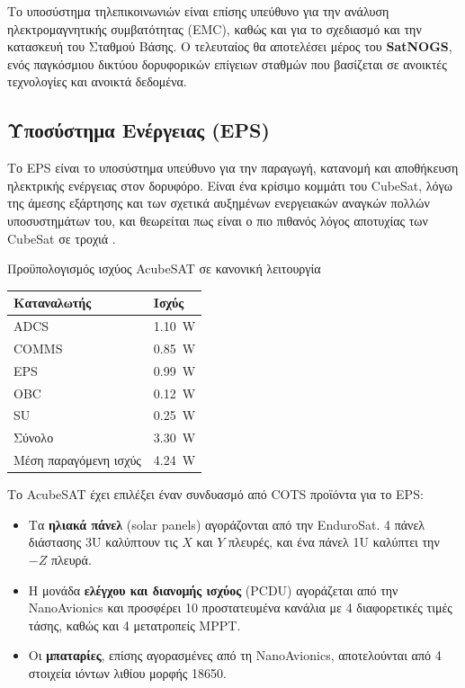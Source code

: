 \documentclass[a4paper,nobib]{tufte-book}
\begin{document}
Το υποσύστημα τηλεπικοινωνιών είναι επίσης υπεύθυνο για την ανάλυση ηλεκτρομαγνητικής συμβατότητας (\acs{EMC}), καθώς και για το σχεδιασμό και την κατασκευή του Σταθμού Βάσης. Ο τελευταίος θα αποτελέσει μέρος του \textbf{SatNOGS}\autocite{white_overview_satellite_2018}, ενός παγκόσμιου δικτύου δορυφορικών επίγειων σταθμών που βασίζεται σε ανοικτές τεχνολογίες και ανοικτά δεδομένα.

\subsection{Υποσύστημα Ενέργειας (\acs{EPS})}

Το \ac{EPS} είναι το υποσύστημα υπεύθυνο για την παραγωγή, κατανομή και αποθήκευση ηλεκτρικής ενέργειας στον δορυφόρο. Είναι ένα κρίσιμο κομμάτι του CubeSat, λόγω της άμεσης εξάρτησης και των σχετικά αυξημένων ενεργειακών αναγκών πολλών υποσυστημάτων του, και θεωρείται πως είναι ο πιο πιθανός λόγος αποτυχίας των CubeSat σε τροχιά \autocite{langer_reliability_cubesats_2016}.

\begin{margintable}
	\caption{Προϋπολογισμός ισχύος AcubeSAT σε κανονική λειτουργία}
	\label{tab:power_budget}
	\begin{tabularx}{\linewidth}{@{}lX@{}}
		\toprule
		\textbf{Καταναλωτής}            & \textbf{Ισχύς}            \\ \midrule
		\acs{ADCS}          & \SI{1.10}{\watt} \\
		\acs{COMMS}         & \SI{0.85}{\watt} \\
		\acs{EPS}           & \SI{0.99}{\watt} \\
		\acs{OBC}           & \SI{0.12}{\watt} \\
		\acs{SU}            & \SI{0.25}{\watt} \\ \midrule
		Σύνολο               & \SI{3.30}{\watt} \\
		Μέση παραγόμενη ισχύς & \SI{4.24}{\watt} \\ \bottomrule
	\end{tabularx}
\end{margintable}

Το AcubeSAT έχει επιλέξει έναν συνδυασμό από \ac{COTS} προϊόντα για το \ac{EPS}: \autocite{DDJF_SYS}
\begin{itemize}
	\item Τα \textbf{ηλιακά πάνελ} (solar panels) αγοράζονται από την EnduroSat. 4 πάνελ διάστασης 3U καλύπτουν τις \(X\) και \(Y\) πλευρές, και ένα πάνελ 1U καλύπτει την \(-Z\) πλευρά.
	\item Η μονάδα \textbf{ελέγχου και διανομής ισχύος} (\acs{PCDU}) αγοράζεται από την NanoAvionics και προσφέρει 10 προστατευμένα κανάλια με 4 διαφορετικές τιμές τάσης, καθώς και 4 μετατροπείς \acs{MPPT}.
	\item Οι \textbf{μπαταρίες}, επίσης αγορασμένες από τη NanoAvionics, αποτελούνται από 4 στοιχεία ιόντων λιθίου μορφής 18650.
\end{itemize}
\end{document}
